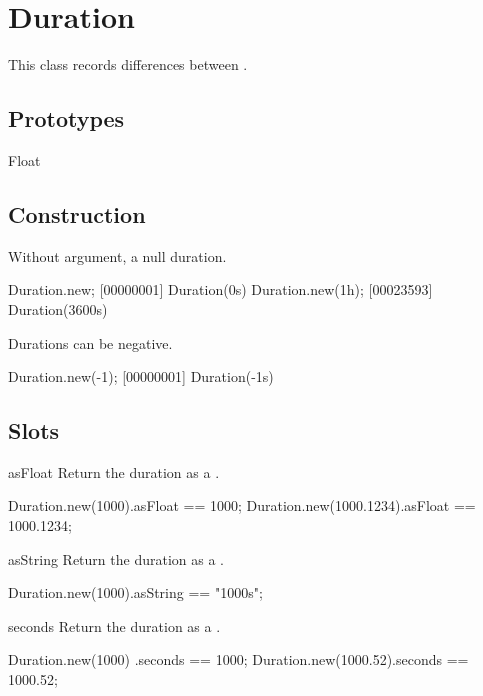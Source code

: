 
\section{Duration}

This class records differences between .
\experimental{}

\subsection{Prototypes}
\begin{refObjects}
\item[Float]
\end{refObjects}

\subsection{Construction}

Without argument, a null duration.

\begin{urbiscript}[firstnumber=1]
Duration.new;
[00000001] Duration(0s)
Duration.new(1h);
[00023593] Duration(3600s)
\end{urbiscript}

Durations can be negative.

\begin{urbiscript}
Duration.new(-1);
[00000001] Duration(-1s)
\end{urbiscript}


\subsection{Slots}

\begin{urbiscriptapi}
\item[asFloat]
  Return the duration as a .
\begin{urbiassert}
Duration.new(1000).asFloat == 1000;
Duration.new(1000.1234).asFloat == 1000.1234;
\end{urbiassert}

\item[asString]
  Return the duration as a .
\begin{urbiassert}
Duration.new(1000).asString == "1000s";
\end{urbiassert}

\item[seconds]
  Return the duration as a .
\begin{urbiassert}
Duration.new(1000)   .seconds == 1000;
Duration.new(1000.52).seconds == 1000.52;
\end{urbiassert}
\end{urbiscriptapi}


